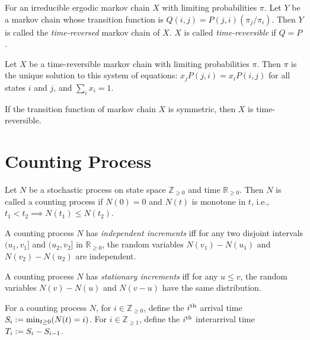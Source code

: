 \documentclass[a4paper, 12pt, fleqn]{article}
\begin{document}
\begin{definition}
For an irreducible ergodic markov chain $X$ with limiting probabilities $\pi$.
Let $Y$ be a markov chain whose transition function is $Q(i, j) = P(j, i)(\pi_j/\pi_i)$.
Then $Y$ is called the \emph{time-reversed} markov chain of $X$.
$X$ is called \emph{time-reversible} if $Q = P$.
\end{definition}

\begin{theorem}
Let $X$ be a time-reversible markov chain with limiting probabilities $\pi$.
Then $\pi$ is the unique solution to this system of equations:
$x_jP(j, i) = x_iP(i, j)$ for all states $i$ and $j$, and $\sum_i x_i = 1$.
\end{theorem}

\begin{theorem}
If the transition function of markov chain $X$ is symmetric, then $X$ is time-reversible.
\end{theorem}

\section{Counting Process}

\begin{definition}
Let $N$ be a stochastic process on state space $\mathbb{Z}_{\ge 0}$ and time $\mathbb{R}_{\ge 0}$.
Then $N$ is called a counting process if $N(0) = 0$ and $N(t)$ is monotone in $t$,
i.e., $t_1 < t_2 \implies N(t_1) \le N(t_2)$.
\end{definition}

\begin{definition}
A counting process $N$ has \emph{independent increments} iff
for any two disjoint intervals $(u_1, v_1]$ and $(u_2, v_2]$ in $\mathbb{R}_{\ge 0}$,
the random variables $N(v_1) - N(u_1)$ and $N(v_2) - N(u_2)$ are independent.
\end{definition}

\begin{definition}
A counting process $N$ has \emph{stationary increments} iff for any $u \le v$,
the random variables $N(v) - N(u)$ and $N(v-u)$ have the same distribution.
\end{definition}

\begin{definition}
For a counting process $N$, for $i \in \mathbb{Z}_{\ge 0}$,
define the $i^{\textrm{th}}$ arrival time $S_i := \min_{t \ge 0} (N(t) = i)$.
For $i \in \mathbb{Z}_{\ge 1}$, define the $i^{\textrm{th}}$ interarrival time $T_i := S_i - S_{i-1}$.
\end{definition}
\end{document}
